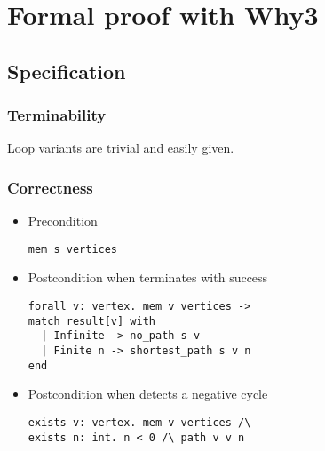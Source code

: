 \documentclass{beamer}
\begin{document}
\section{Formal proof with Why3}
\frame{\sectionpage}

\subsection{Specification}

\begin{frame}[fragile]\frametitle{Terminability}

Loop variants are trivial and easily given.\vspace*{12pt}

\begin{algorithmic}[1]
\ENDFOR
\ENDFOR
{}
\ENDIF
\ENDFOR
{}
\end{algorithmic}

\end{frame}

\begin{frame}[fragile]\frametitle{Correctness}

\begin{itemize}

\item \alert{Precondition}

\begin{lstlisting}[language=why3]
mem s vertices
\end{lstlisting}

\item \alert{Postcondition} when terminates with success
\begin{lstlisting}[language=why3]
forall v: vertex. mem v vertices ->
match result[v] with
  | Infinite -> no_path s v
  | Finite n -> shortest_path s v n
end
\end{lstlisting}

\item \alert{Postcondition} when detects a negative cycle
\begin{lstlisting}[language=why3]
exists v: vertex. mem v vertices /\
exists n: int. n < 0 /\ path v v n
\end{lstlisting}
\end{itemize}

\end{frame}
\end{document}
